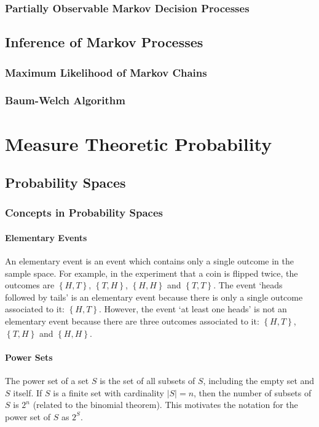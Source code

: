 \documentclass[11pt]{report} %
\begin{document}
\subsection{Partially Observable Markov Decision Processes}

\section{Inference of Markov Processes}

\subsection{Maximum Likelihood of Markov Chains}

\subsection{Baum-Welch Algorithm}

\chapter{Measure Theoretic Probability}

\section{Probability Spaces}

\subsection{Concepts in Probability Spaces}

\subsubsection{Elementary Events}
An elementary event is an event which contains only a single outcome in the sample space. For example, in the experiment that a coin is flipped twice, the outcomes are $\left\{H, T\right\}$, $\left\{T, H\right\}$, $\left\{H, H\right\}$ and $\left\{T, T\right\}$. The event `heads followed by tails' is an elementary event because there is only a single outcome associated to it: $\left\{H, T\right\}$. However, the event `at least one heads' is not an elementary event because there are three outcomes associated to it: $\left\{H, T\right\}$, $\left\{T, H\right\}$ and $\left\{H, H\right\}$.

\subsubsection{Power Sets}
The power set of a set $S$ is the set of all subsets of $S$, including the empty set and $S$ itself. If $S$ is a finite set with cardinality $\left|S\right| = n$, then the number of subsets of $S$ is $2^{n}$ (related to the binomial theorem). This motivates the notation for the power set of $S$ as $2^{S}$. \\
\end{document}
